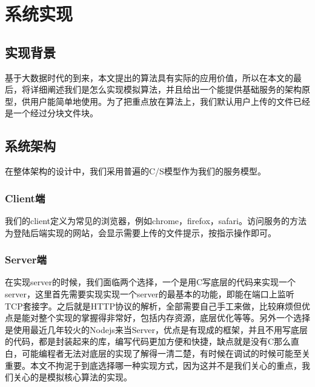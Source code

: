 
\chapter{系统实现}
\label{chap:impl}

\section{实现背景}
\label{sec:backgroud}

基于大数据时代的到来，本文提出的算法具有实际的应用价值，所以在本文的最后，将详细阐述我们是怎么实现模拟算法，并且给出一个能提供基础服务的架构原型，供用户能简单地使用。为了把重点放在算法上，我们默认用户上传的文件已经是一个经过分块文件块。

\section{系统架构}
\label{sec:arch}

在整体架构的设计中，我们采用普遍的C/S模型作为我们的服务模型。

\subsection{Client端}

我们的client定义为常见的浏览器，例如chrome，firefox，safari。访问服务的方法为登陆后端实现的网站，会显示需要上传的文件提示，按指示操作即可。

\subsection{Server端}

在实现server的时候，我们面临两个选择，一个是用C写底层的代码来实现一个server，这里首先需要实现实现一个server的最基本的功能，即能在端口上监听TCP套接字。之后就是HTTP协议的解析，全部需要自己手工来做，比较麻烦但优点是能对整个实现的掌握得非常好，包括内存资源，底层优化等等。另外一个选择是使用最近几年较火的Nodejs来当Server，优点是有现成的框架，并且不用写底层的代码，都是封装起来的库，编写代码更加方便和快捷，缺点就是没有C那么直白，可能编程者无法对底层的实现了解得一清二楚，有时候在调试的时候可能至关重要。本文不拘泥于到底选择哪一种实现方式，因为这并不是我们关心的重点，我们关心的是模拟核心算法的实现。


